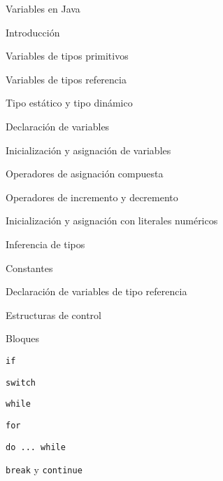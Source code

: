 \begin{longenum}
\begin{longenum}
\begin{longenum}
\begin{longenum}
\begin{longenum}
                \end{longenum}
            \end{longenum}
        \end{longenum}
        \item Variables en Java
        \begin{longenum}
            \item Introducción
            \item Variables de tipos primitivos
            \item Variables de tipos referencia
            \begin{longenum}
                \item Tipo estático y tipo dinámico
            \end{longenum}
            \item Declaración de variables
            \begin{longenum}
                \item Inicialización y asignación de variables
                \begin{longenum}
                    \item Operadores de asignación compuesta
                    \item Operadores de incremento y decremento
                    \item Inicialización y asignación con literales numéricos
                \end{longenum}
                \item Inferencia de tipos
                \item Constantes
                \item Declaración de variables de tipo referencia
            \end{longenum}
        \end{longenum}
        \item Estructuras de control
        \begin{longenum}
            \item Bloques
            \item \texttt{if}
            \item \texttt{switch}
            \item \texttt{while}
            \item \texttt{for}
            \item \texttt{do ... while}
            \item \texttt{break} y \texttt{continue}
        \end{longenum}

\end{longenum}
\end{longenum}
